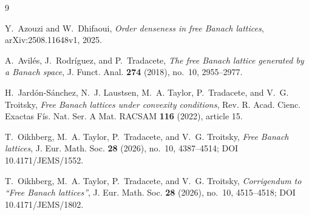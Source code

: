 \documentclass[11pt]{article}
\theoremstyle{remark}
\begin{document}
\begin{thebibliography}{9}

Y.~Azouzi and W.~Dhifaoui,
\emph{Order denseness in free Banach lattices},
arXiv:2508.11648v1, 2025.

A.~Avil\'es, J.~Rodr\'iguez, and P.~Tradacete,
\emph{The free Banach lattice generated by a Banach space},
J. Funct. Anal. \textbf{274} (2018), no.~10, 2955--2977.

H.~Jard\'on-S\'anchez, N.~J. Laustsen, M.~A. Taylor, P.~Tradacete,
and V.~G. Troitsky,
\emph{Free Banach lattices under convexity conditions},
Rev. R. Acad. Cienc. Exactas F\'is. Nat. Ser. A Mat. RACSAM
\textbf{116} (2022), article 15.

T.~Oikhberg, M.~A. Taylor, P.~Tradacete, and V.~G. Troitsky,
\emph{Free Banach lattices},
J. Eur. Math. Soc. \textbf{28} (2026), no.~10, 4387--4514;
DOI 10.4171/JEMS/1552.

T.~Oikhberg, M.~A. Taylor, P.~Tradacete, and V.~G. Troitsky,
\emph{Corrigendum to ``Free Banach lattices''},
J. Eur. Math. Soc. \textbf{28} (2026), no.~10, 4515--4518;
DOI 10.4171/JEMS/1802.

\end{thebibliography}
\end{document}
